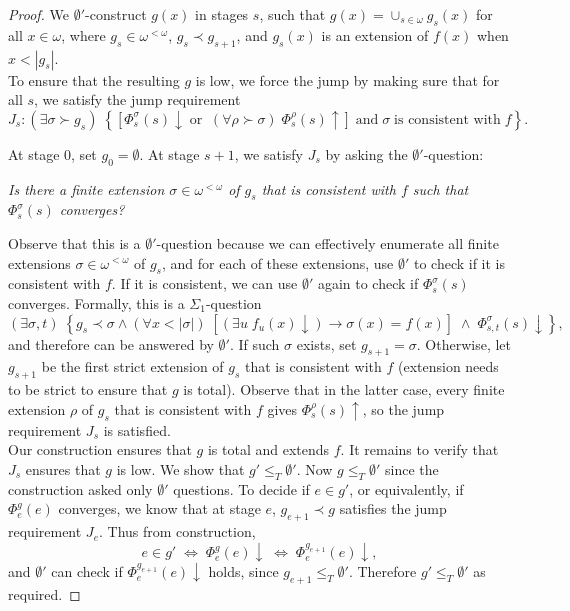 \documentclass{article}
\begin{document}
  \begin{proof}
    We $\emptyset'$-construct $g(x)$ in stages $s$, such that
    $g(x)=\cup_{s\in\omega} g_s(x)$ for all $x\in\omega$, where $g_s\in
    \omega^{<\omega}$, $g_s\prec g_{s+1}$, and $g_s(x)$ is an extension of
    $f(x)$ when $x<|g_s|$. \\

    To ensure that the resulting $g$ is low, we force the jump by
    making sure that for all $s$, we satisfy the jump requirement
    \[J_s: (\exists \sigma\succ g_s)\; \left\{ \left[
    \Phi_s^{\sigma}(s)\downarrow\; \text{or}\;\; (\forall
    \rho\succ\sigma)\; \Phi_s^{\rho}(s)\uparrow \right]\; \text{and}\;
    \sigma\; \text{is consistent with}\; f\right\}.\]

    At stage 0, set $g_0=\emptyset$. At stage $s+1$, we satisfy $J_s$ by
    asking the $\emptyset'$-question:
    \begin{center}
      \textit{Is there a finite extension $\sigma\in\omega^{<\omega}$ of
      $g_s$ that is consistent with $f$ such that $\Phi^\sigma_s(s)$
      converges?}
    \end{center}

    Observe that this is a $\emptyset'$-question because we can
    effectively enumerate all finite extensions
    $\sigma\in\omega^{<\omega}$ of $g_s$, and for each of these extensions,
    use $\emptyset'$ to check if it is consistent with $f$. If it is
    consistent, we can use $\emptyset'$ again to check if
    $\Phi^\sigma_s(s)$ converges. Formally, this is a $\Sigma_1$-question
    \[(\exists \sigma,t)\; \left\{ g_s\prec\sigma \wedge (\forall
    x<|\sigma|)\; \left[ (\exists u\; f_u(x)\downarrow)
    \rightarrow\sigma(x)=f(x) \right]\; \wedge\;
    \Phi^\sigma_{s,t}(s)\downarrow \right\},\]
    and therefore can be answered by $\emptyset'$. If such $\sigma$ exists,
    set $g_{s+1}=\sigma$. Otherwise, let $g_{s+1}$ be the first strict
    extension of $g_s$ that is consistent with $f$ (extension needs to be
    strict to ensure that $g$ is total). Observe that in the latter case,
    every finite extension $\rho$ of $g_s$ that is consistent with $f$
    gives $\Phi_s^\rho(s)\uparrow$, so the jump requirement $J_s$ is
    satisfied. \\

    Our construction ensures that $g$ is total and extends $f$. It remains
    to verify that $J_s$ ensures that $g$ is low. We show that
    $g'\leq_T\emptyset'$. Now $g\leq_T\emptyset'$ since the construction
    asked only $\emptyset'$ questions. To decide if $e\in g'$, or
    equivalently, if $\Phi_e^g(e)$ converges, we know that at stage $e$,
    $g_{e+1}\prec g$ satisfies the jump requirement $J_e$. Thus from
    construction, \[e\in g'\; \Leftrightarrow\; \Phi_e^g(e)\downarrow\;
    \Leftrightarrow\; \Phi_e^{g_{e+1}}(e)\downarrow,\] and $\emptyset'$ can
    check if $\Phi_e^{g_{e+1}}(e)\downarrow$ holds, since $g_{e+1}\leq_T
    \emptyset'$. Therefore $g'\leq_T\emptyset'$ as required.
  \end{proof}
\end{document}
